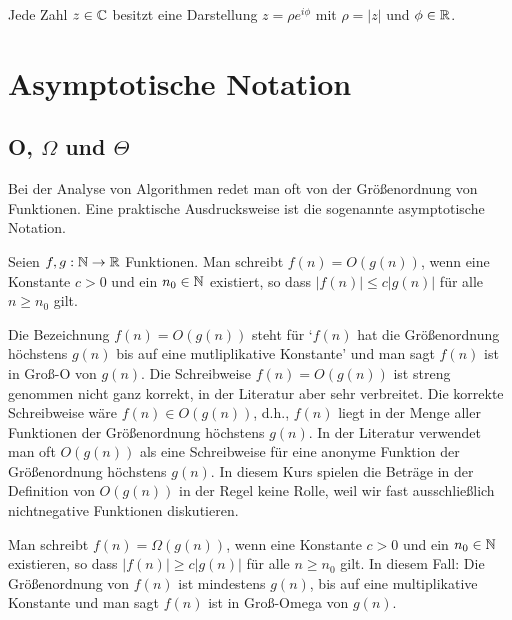 \begin{bem}
	Jede Zahl $z \in \mathbb{C}$ besitzt eine Darstellung $z = \rho e^{i \phi}$ mit $\rho = |z|$ und $\phi \in \mathbb{R}$. 
\end{bem} 

\section{Asymptotische Notation}

\subsection{O, $\Omega$ und $\Theta$}

\begin{bem}
Bei der Analyse von Algorithmen redet man oft von der Größenordnung von Funktionen. Eine praktische Ausdrucksweise ist die sogenannte asymptotische Notation.
\end{bem} 

\begin{defn} 
Seien $f, g: \mathbb{N} \to \mathbb{R}$ Funktionen. 
Man schreibt $f(n) = O(g(n))$, wenn eine Konstante $c>0$ und ein $n_0 \in \mathbb{N}$ existiert, so dass $|f(n)| \le c |g(n)|$ für alle $n \ge n_0$ gilt. 
\end{defn} 

\begin{bem} 
Die Bezeichnung $f(n)=O(g(n))$ steht für `$f(n)$ hat die Größenordnung höchstens $g(n)$ bis auf eine mutliplikative Konstante' und man sagt \glqq$f(n)$ ist in Groß-O von $g(n)$\grqq. Die Schreibweise $f(n) = O(g(n))$ ist streng genommen nicht ganz korrekt, in der Literatur aber sehr verbreitet. Die korrekte Schreibweise wäre $f(n) \in O(g(n))$, d.h., $f(n)$ liegt in der Menge aller Funktionen der Größenordnung höchstens $g(n)$. In der Literatur verwendet man oft $O(g(n))$ als eine Schreibweise für eine anonyme Funktion der Größenordnung höchstens $g(n)$. In diesem Kurs spielen die Beträge in der Definition von $O(g(n))$ in der Regel keine Rolle, weil wir fast ausschließlich nichtnegative Funktionen diskutieren. 
\end{bem} 

\begin{defn}
Man schreibt $f(n) = \Omega(g(n))$, wenn eine Konstante $c>0$ und ein $n_0 \in \mathbb{N}$ existieren, so dass $|f(n)| \ge c |g(n)|$ für alle $n \ge n_0$ gilt. In diesem Fall: Die Größenordnung von $f(n)$ ist mindestens $g(n)$, bis auf eine multiplikative Konstante und man sagt \glqq$f(n)$ ist in Groß-Omega von $g(n)$\grqq. 
\end{defn} 

